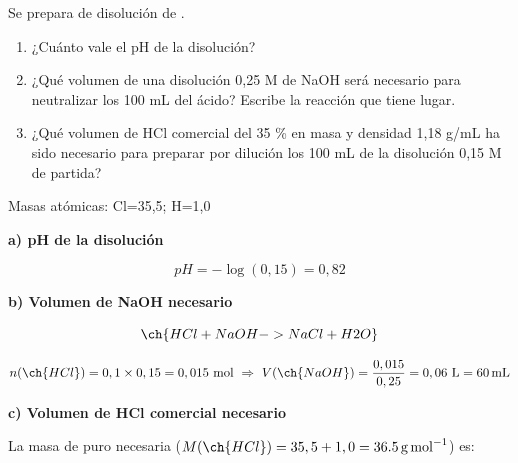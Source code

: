 \begin{exerciseEVAU}
    Se prepara  de disolución  de .
    \begin{enumerate}[label=\letraminuscula]
        \item ¿Cuánto vale el pH de la disolución?
        \item  ¿Qué volumen de una disolución 0,25 M de NaOH será necesario para neutralizar los 100 mL del ácido? Escribe la reacción que tiene lugar.
        \item ¿Qué volumen de HCl comercial del 35 \% en masa y densidad 1,18 g/mL ha sido necesario para preparar por dilución los 100 mL de la disolución 0,15 M de partida?
    \end{enumerate}

    \datos{} Masas atómicas: Cl=35,5; H=1,0


    \begin{solu}


        \textbf{a) pH de la disolución}

        \begin{equation*}
            pH = -\log(0,15) = 0,82
        \end{equation*}

        \textbf{b) Volumen de NaOH necesario}

        \begin{equation*}
            \ch{HCl + NaOH -> NaCl + H2O}
        \end{equation*}

        \begin{equation*}
            n(\ch{HCl}) = 0,1\times0,15 = 0,015 \ \text{mol} \ \Rightarrow \ V(\ch{NaOH}) = \dfrac{0,015}{0,25} = 0,06 \ \si{\litre} = \SI{60}{\milli\litre}
        \end{equation*}

        \textbf{c) Volumen de HCl comercial necesario}

        La masa de  puro necesaria (\(M(\ch{HCl}) = 35,5+1,0 = \SI{36.5}{\gram\per\mole}\)) es:


\end{solu}
\end{exerciseEVAU}
